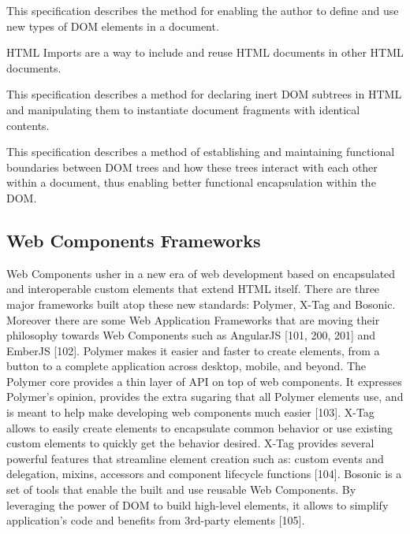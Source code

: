 \documentclass{sig-alternate}
\begin{document}
\begin{description}
\itemsep1pt\parskip0pt
	\item[Custom Elements] This specification describes the method for enabling the author to define and use new types of DOM elements in a document.
	\item[HTML Imports] HTML Imports are a way to include and reuse HTML documents in other HTML documents.
	\item[Templates] This specification describes a method for declaring inert DOM subtrees in HTML and manipulating them to instantiate document fragments with identical contents.
	\item[Shadow DOM] This specification describes a method of establishing and maintaining functional boundaries between DOM trees and how these trees interact with each other within a document, thus enabling better functional encapsulation within the DOM.
\end{description}

\subsection{Web Components Frameworks}

Web Components usher in a new era of web development based on encapsulated and interoperable custom elements that extend HTML itself.
There are three major frameworks built atop these new standards: Polymer, X-Tag and Bosonic.
Moreover there are some Web Application Frameworks that are moving their philosophy towards Web Components such as AngularJS [101, 200, 201] and EmberJS [102].
Polymer makes it easier and faster to create elements, from a button to a complete application across desktop, mobile, and beyond. The Polymer core provides a thin layer of API on top of web components. It expresses Polymer's opinion, provides the extra sugaring that all Polymer elements use, and is meant to help make developing web components much easier [103].
X-Tag allows to easily create elements to encapsulate common behavior or use existing custom elements to quickly get the behavior desired. X-Tag provides several powerful features that streamline element creation such as: custom events and delegation, mixins, accessors and component lifecycle functions [104].
Bosonic is a set of tools that enable the built and use reusable Web Components. By leveraging the power of DOM to build high-level elements, it allows to simplify application's code and benefits from 3rd-party elements [105].
\end{document}
